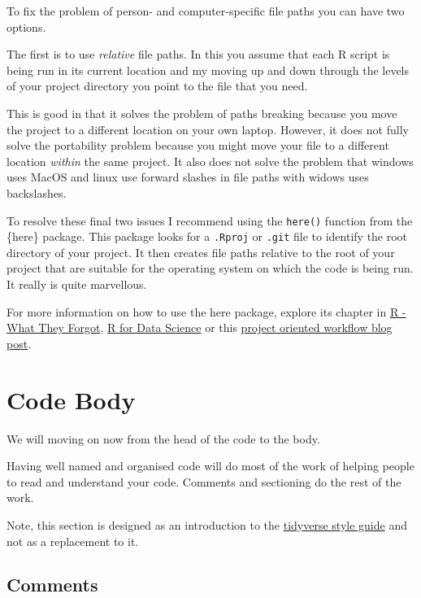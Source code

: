 \documentclass[
  letterpaper,
  DIV=11,
  numbers=noendperiod]{scrreprt}
\begin{document}
To fix the problem of person- and computer-specific file paths you can
have two options.

The first is to use \emph{relative} file paths. In this you assume that
each R script is being run in its current location and my moving up and
down through the levels of your project directory you point to the file
that you need.

This is good in that it solves the problem of paths breaking because you
move the project to a different location on your own laptop. However, it
does not fully solve the portability problem because you might move your
file to a different location \emph{within} the same project. It also
does not solve the problem that windows uses MacOS and linux use forward
slashes in file paths with widows uses backslashes.

To resolve these final two issues I recommend using the \texttt{here()}
function from the \{here\} package. This package looks for a
\texttt{.Rproj} or \texttt{.git} file to identify the root directory of
your project. It then creates file paths relative to the root of your
project that are suitable for the operating system on which the code is
being run. It really is quite marvellous.

For more information on how to use the here package, explore its chapter
in \href{https://rstats.wtf/project-oriented-workflow.html}{R - What
They Forgot}, \href{https://r4ds.had.co.nz/workflow-projects.html}{R for
Data Science} or this
\href{https://www.tidyverse.org/blog/2017/12/workflow-vs-script/}{project
oriented workflow blog post}.

\section{Code Body}\label{code-body}

We will moving on now from the head of the code to the body.

Having well named and organised code will do most of the work of helping
people to read and understand your code. Comments and sectioning do the
rest of the work.

Note, this section is designed as an introduction to the
\href{https://style.tidyverse.org/}{tidyverse style guide} and not as a
replacement to it.

\subsection{Comments}\label{comments}
\end{document}

